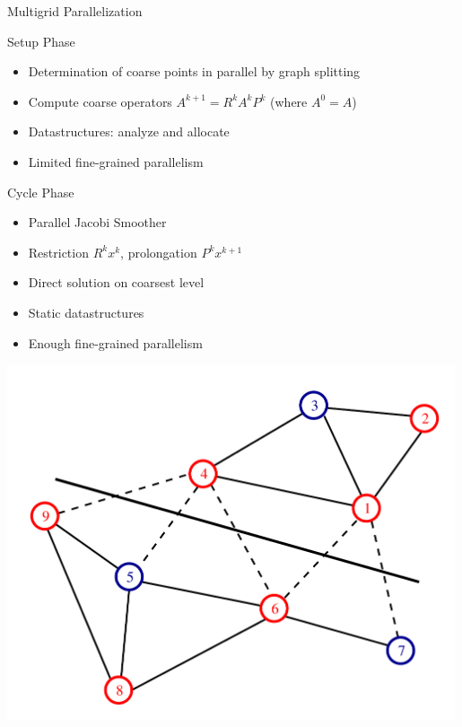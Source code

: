 \begin{frame}{Multigrid Parallelization}

 \begin{block}{Setup Phase}
  \begin{itemize}
   \item Determination of coarse points in parallel by graph splitting
   \item Compute coarse operators $A^{k+1} = R^k A^k P^k$ (where $A^0 = A$)
   \item Datastructures: analyze and allocate
   \item Limited fine-grained parallelism
  \end{itemize}
 \end{block}

 \begin{minipage}{0.58\textwidth}
 \begin{block}{Cycle Phase}
  \begin{itemize}
   \item Parallel Jacobi Smoother
   \item Restriction $R^k x^k$, prolongation $P^k x^{k+1}$
   \item Direct solution on coarsest level
   \item Static datastructures
   \item Enough fine-grained parallelism
  \end{itemize}
 \end{block}
 \end{minipage}
 \begin{minipage}{0.4\textwidth} \vspace*{-1.5cm}
  \includegraphics[width=0.99\textwidth]{figures/graph-rs0.pdf} \\ \vspace*{0.1cm}
 \end{minipage}

 \vspace*{0.5cm}

\end{frame}


